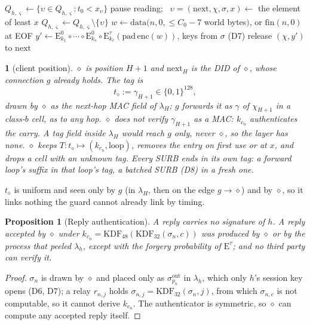 \documentclass[journal]{IEEEtran}
\newtheorem{proposition}{Proposition}
\newcommand{\namedhead}{}
\newtheorem*{namedenv}{\namedhead}
\newenvironment{defD}[2]{\renewcommand{\namedhead}{Definition #1}%
  \begin{namedenv}[#2]}{\end{namedenv}}
\newcommand{\cl}{\diamond}
\newcommand{\Enc}[2]{\mathrm{E}^{#1}_{#2}}
\newcommand{\nxt}{\mathrm{next}}
\newcommand{\pad}{\mathrm{pad}}
\newcommand{\enc}{\mathrm{enc}}
\newcommand{\KDF}{\mathrm{KDF}}
\newcommand{\sid}{\varsigma}
\begin{document}
\begin{algorithm}[t]
\caption{$\mathrm{Reply}_{h,\sid}(t_0)$: world bytes or EOF ready at
session $\sid$ of $h$}
\label{alg:reply}
\begin{algorithmic}[1]
\State $Q_{h,\sid}\gets\{\upsilon\in Q_{h,\sid}: t_0<x_\upsilon\}$
\If{$Q_{h,\sid}=\emptyset$} \State pause reading;\ \Return
\EndIf
\State $\upsilon=(\nxt,\chi,\sigma,x)\gets$ the element of least $x$
\State $Q_{h,\sid}\gets Q_{h,\sid}\setminus\{\upsilon\}$
\State $w\gets\mathrm{data}(n,0,\le C_0-7$ world bytes$)$, or $\mathrm{fin}(n,0)$ at EOF
\State $y'\gets\Enc{0}{k_1}\circ\cdots\circ\Enc{0}{k_s}\circ
  \Enc{\tau}{k_c}(\pad\,\enc(w))$, keys from $\sigma$ (D7)
\State release $(\chi,y')$ to $\nxt$
\end{algorithmic}
\end{algorithm}

\begin{defD}{D6$'$}{client position}
$\cl$ is position $H+1$ and $\nxt_H$ is the DID of $\cl$, whose
connection $g$ already holds.  The tag is
\[
t_\cl:=\gamma_{H+1}\in\{0,1\}^{128},
\]
drawn by $\cl$ as the next-hop MAC field of $\lambda_H$; $g$ forwards it
as $\gamma$ of $\chi_{H+1}$ in a class-$b$ cell, as to any hop.  $\cl$ does
not verify $\gamma_{H+1}$ as a MAC: $k_{c_n}$ authenticates the carry.  A
tag field inside $\lambda_H$ would reach $g$ only, never $\cl$, so the
layer has none.
$\cl$ keeps $T:t_\cl\mapsto(k_{c_n},\text{loop})$, removes the entry on
first use or at $x$, and drops a cell with an unknown tag.  Every SURB ends
in its own tag: a forward loop's suffix in that loop's tag, a batched SURB
(D8) in a fresh one.
\end{defD}

$t_\cl$ is uniform and seen only by $g$ (in $\lambda_H$, then on the edge
$g\to\cl$) and by $\cl$, so it links nothing the guard cannot already link
by timing.

\begin{proposition}[Reply authentication]\label{prop:replyauth}
A reply carries no signature of $h$.  A reply accepted by $\cl$ under
$k_{c_n}=\KDF_{48}(\KDF_{32}(\sigma_n,c))$ was produced by $\cl$ or by the
process that peeled $\lambda_h$, except with the forgery probability of
$\Enc{\tau}{}$; and no third party can verify it.
\end{proposition}
\begin{proof}
$\sigma_n$ is drawn by $\cl$ and placed only as $\sigma^{\mathrm{out}}_{p_n}$
in $\lambda_h$, which only $h$'s session key opens (D6, D7); a relay
$r_{n,j}$ holds $\sigma_{n,j}=\KDF_{32}(\sigma_n,j)$, from which
$\sigma_{n,c}$ is not computable, so it cannot derive $k_{c_n}$.  The
authenticator is symmetric, so $\cl$ can compute any accepted reply
itself.
\end{proof}
\end{document}
